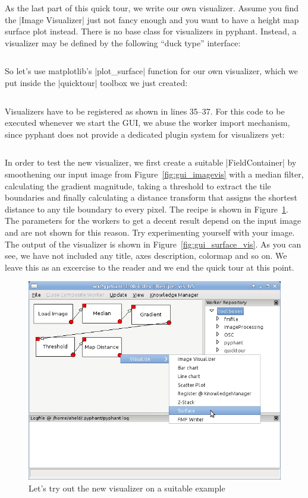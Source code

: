 \documentclass[a4paper]{article}
\begin{document}
\FloatBarrier

As the last part of this quick tour, we write our own
visualizer. Assume you find the |Image Visualizer| just not fancy
enough and you want to have a height map surface plot instead. There
is no base class for visualizers in pyphant. Instead, a visualizer
may be defined by the following ``duck type'' interface:

\inputminted[linenos]{python}{api007.py}

So let's use matplotlib's\cite{matplotlib} |plot_surface| function for
our own visualizer, which we put inside the |quicktour| toolbox we
just created: \inputminted[linenos]{python}{api008.py} Visualizers
have to be registered as shown in lines 35--37. For this code to be
executed whenever we start the GUI, we abuse the worker import
mechanism, since pyphant does not provide a dedicated plugin system
for visualizers yet: \inputminted[linenos]{python}{api009.py} In order
to test the new visualizer, we first create a suitable
|FieldContainer| by smoothening our input image from
Figure~\ref{fig:gui_imagevis} with a median filter, calculating the
gradient magnitude, taking a threshold to extract the tile boundaries
and finally calculating a distance transform that assigns the shortest
distance to any tile boundary to every pixel. The recipe is shown in
Figure~\ref{fig:gui_use_surface_vis}. The parameters for the workers
to get a decent result depend on the input image and are not shown for
this reason. Try experimenting yourself with your image. The output of
the visualizer is shown in Figure~\ref{fig:gui_surface_vis}. As you
can see, we have not included any title, axes description, colormap
and so on. We leave this as an excercise to the reader and we end the
quick tour at this point.
\begin{figure}[h]
  \centering
  \includegraphics[scale=0.75]{fig/gui_use_surface_vis.png}
  \caption{Let's try out the new visualizer on a suitable example}
  \label{fig:gui_use_surface_vis}
\end{figure}
\end{document}
